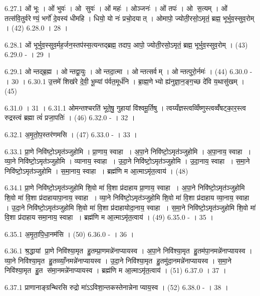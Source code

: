 6.27.1
ओं भूः । ओं भुवः॑ । ओ सुवः॑ । ओं महः॑ । ओञ्जनः॑ । ओं तपः॑ । ओ स॒त्यम् । ओं तत्स॑वि॒तुर्वरेण्यं॒ भर्गो॑ दे॒वस्य॑ धीमहि । धियो॒ यो नः॑ प्रचो॒दयात् । ओमापो॒ ज्योती॒रसो॒ऽमृतं॒ ब्रह्म॒ भूर्भुव॒स्सुव॒रोम् । (42)
6.28.0
। 28 ।
\anuvakamend

6.28.1
ओं भूर्भुव॒स्सुव॒र्मह॒र्जन॒स्तप॑स्स॒त्यन्तद्ब्रह्म॒ तदाप॒ आपो॒ ज्योती॒रसो॒ऽमृतं॒ ब्रह्म॒ भूर्भुव॒स्सुव॒रोम् । (43)
6.29.0
- । 29 ।
\anuvakamend

6.29.1
ओन्तद्ब्र॒ह्म । ओन्तद्वा॒युः । ओन्तदा॒त्मा । ओन्तत्सर्वम् । ओन्तत्पुरो॒र्नमः॑ । (44)
6.30.0
- । 30 ।
6.30.1
उ॒त्तमे॑ शिख॑रे दे॒वी॒ भू॒म्यां प॑र्वत॒मूर्ध॑नि । ब्रा॒ह्म॒णेभ्यो ह्य॑नुज्ञा॒न॒ङ्ग॒च्छ दे॑वि य॒थासु॑खम् । (45)
\anuvakamend

6.31.0
। 31 ।
6.31.1
ओमन्तश्चरति॑ भूते॒षु॒ गुहायां वि॑श्वमू॒र्तिषु । त्वय्यँज्ञस्त्वव्विँष्णुस्त्वव्वँ॑षट्का॒र॒स्त्व रुद्रस्त्वं ब्रह्मा त्वं॑ प्रजा॒पतिः॑ । (46)
6.32.0
- । 32 ।
\anuvakamend

6.32.1
अ॒मृ॒तो॒प॒स्तर॑णमसि । (47)
6.33.0
- । 33 ।
\anuvakamend

6.33.1
प्रा॒णे निवि॑ष्टो॒ऽमृत॑ञ्जुहोमि । प्रा॒णाय॒ स्वाहा । अ॒पा॒ने निवि॑ष्टो॒ऽमृत॑ञ्जुहोमि । अ॒पा॒नाय॒ स्वाहा । व्या॒ने निवि॑ष्टो॒ऽमृत॑ञ्जुहोमि । व्यानाय॒ स्वाहा । उ॒दा॒ने निवि॑ष्टो॒ऽमृत॑ञ्जुहोमि । उ॒दा॒नाय॒ स्वाहा । स॒मा॒ने निवि॑ष्टो॒ऽमृत॑ञ्जुहोमि । स॒मा॒नाय॒ स्वाहा । ब्रह्म॑णि म आ॒त्माऽमृ॑त॒त्वाय॑ । (48)
\anuvakamend

6.34.1
प्रा॒णे निवि॑ष्टो॒ऽमृत॑ञ्जुहोमि शि॒वो मा॑ वि॒शा प्र॑दाहाय प्रा॒णाय॒ स्वाहा । अ॒पा॒ने निवि॑ष्टो॒ऽमृत॑ञ्जुहोमि शि॒वो मा॑ वि॒शा प्र॑दाहायापा॒नाय॒ स्वाहा । व्या॒ने निवि॑ष्टो॒ऽमृत॑ञ्जुहोमि शि॒वो मा॑ वि॒शा प्र॑दाहाय व्या॒नाय॒ स्वाहा । उ॒दा॒ने निवि॑ष्टो॒ऽमृत॑ञ्जुहोमि शि॒वो मा॑ वि॒शा प्र॑दाहायोदा॒नाय॒ स्वाहा । स॒मा॒ने निवि॑ष्टो॒ऽमृत॑ञ्जुहोमि शि॒वो मा॑ वि॒शा प्र॑दाहाय समा॒नाय॒ स्वाहा । ब्रह्म॑णि म आ॒त्माऽमृ॑त॒त्वाय॑ । (49)
6.35.0
- । 35 ।
\anuvakamend

6.35.1
अ॒मृ॒ता॒पि॒धा॒नम॑सि । (50)
6.36.0
- । 36 ।
\anuvakamend

6.36.1
श्र॒द्धायां प्रा॒णे निवि॑श्या॒मृत हु॒तम्प्रा॒णमन्ने॑नाप्यायस्व । अ॒पा॒ने निवि॑श्या॒मृत हु॒तम॑पा॒नमन्ने॑नाप्यायस्व । व्या॒ने निवि॑श्या॒मृत हु॒तव्व्याँ॒नमन्ने॑नाप्यायस्व । उ॒दा॒ने निवि॑श्या॒मृत हु॒तमु॑दा॒नमन्ने॑नाप्यायस्व । स॒मा॒ने निवि॑श्या॒मृत हु॒त स॑मा॒नमन्ने॑नाप्यायस्व । ब्रह्म॑णि म आ॒त्माऽमृ॑त॒त्वाय॑ । (51)
6.37.0
। 37 ।
\anuvakamend

6.37.1
प्राणानाङ्ग्रन्थिरसि रुद्रो मा॑ऽऽविशा॒न्तकस्तेनान्नेनाप्याय॒स्व । (52)
6.38.0
- । 38 ।
\anuvakamend

